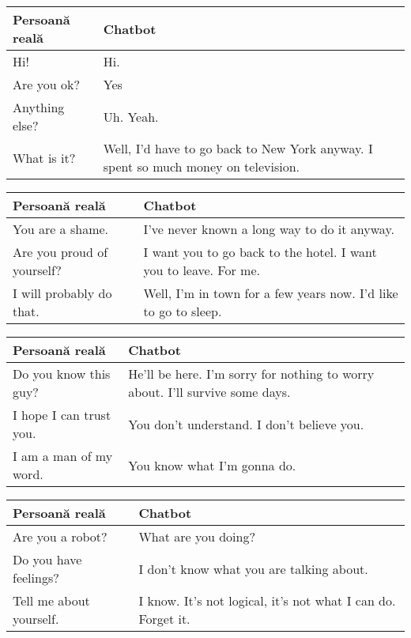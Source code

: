 \begin{center}
  \begin{tabular}{ | m{6.5cm} | m{6.5cm} |}
    \hline
    Persoan\u a real\u a & Chatbot \\ \hline
    Hi! & Hi. \\ 
    Are you ok? & Yes \\ 
    Anything else? & Uh. Yeah. \\
    What is it? & Well, I'd have to go back to New York anyway. I spent so much money on television. \\
    \hline
  \end{tabular}
\end{center}

\begin{center}
  \begin{tabular}{ | m{6.5cm} | m{6.5cm} |}
    \hline
    Persoan\u a real\u a & Chatbot \\ \hline
    You are a shame. & I've never known a long way to do it anyway. \\ 
    Are you proud of yourself? & I want you to go back to the hotel. I want you to leave. For me. \\ 
    I will probably do that. & Well, I'm in town for a few years now. I'd like to go to sleep. \\
    \hline
  \end{tabular}
\end{center}

\begin{center}
  \begin{tabular}{ | m{6.5cm} | m{6.5cm} |}
    \hline
    Persoan\u a real\u a & Chatbot \\ \hline
    Do you know this guy? & He'll be here. I'm sorry for nothing to worry about. I'll survive some days. \\ 
    I hope I can trust you. & You don't understand. I don't believe you. \\ 
    I am a man of my word. & You know what I'm gonna do. \\
    \hline
  \end{tabular}
\end{center}

\begin{center}
  \begin{tabular}{ | m{6.5cm} | m{6.5cm} |}
    \hline
    Persoan\u a real\u a & Chatbot \\ \hline
    Are you a robot? & What are you doing? \\
    Do you have feelings? & I don't know what you are talking about. \\
    Tell me about yourself. & I know. It's not logical, it's not what I can do. Forget it. \\
    \hline
  \end{tabular}
\end{center}



